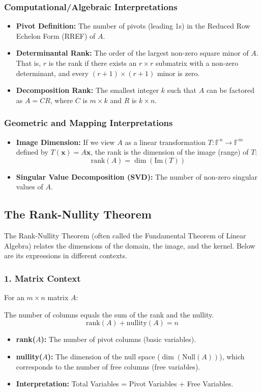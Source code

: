 \subsubsection{Computational/Algebraic Interpretations}
\begin{itemize}
    \item \textbf{Pivot Definition:} The number of pivots (leading 1s) in the Reduced Row Echelon Form (RREF) of $A$.
    \item \textbf{Determinantal Rank:} The order of the largest non-zero square minor of $A$. That is, $r$ is the rank if there exists an $r \times r$ submatrix with a non-zero determinant, and every $(r+1) \times (r+1)$ minor is zero.
    \item \textbf{Decomposition Rank:} The smallest integer $k$ such that $A$ can be factored as $A = CR$, where $C$ is $m \times k$ and $R$ is $k \times n$.
\end{itemize}

\subsubsection{Geometric and Mapping Interpretations}
\begin{itemize}
    \item \textbf{Image Dimension:} If we view $A$ as a linear transformation $T: \mathbb{F}^n \to \mathbb{F}^m$ defined by $T(\mathbf{x}) = A\mathbf{x}$, the rank is the dimension of the image (range) of $T$:
    \[ \text{rank}(A) = \dim(\text{Im}(T)) \]
    \item \textbf{Singular Value Decomposition (SVD):} The number of non-zero singular values of $A$.
\end{itemize}

\subsection{The Rank-Nullity Theorem}

The Rank-Nullity Theorem (often called the Fundamental Theorem of Linear Algebra) relates the dimensions of the domain, the image, and the kernel. Below are its expressions in different contexts.

\subsubsection{1. Matrix Context}
For an $m \times n$ matrix $A$:
\begin{theorem}
The number of columns equals the sum of the rank and the nullity.
\[ \text{rank}(A) + \text{nullity}(A) = n \]
\end{theorem}
\begin{itemize}
    \item \textbf{rank($A$):} The number of pivot columns (basic variables).
    \item \textbf{nullity($A$):} The dimension of the null space ($\dim(\text{Null}(A))$), which corresponds to the number of free columns (free variables).
    \item \textbf{Interpretation:} Total Variables = Pivot Variables + Free Variables.
\end{itemize}

